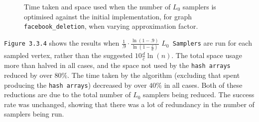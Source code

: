 \documentclass[11pt,twoside,a4paper]{report}
\begin{document}
\begin{figure}[H]
	\label{Figure 16}
	\caption{Time taken and space used when the number of $L_0$ samplers is optimised against the initial implementation, for graph \texttt{facebook\_deletion}, when varying approximation factor.}
\end{figure}
\texttt{Figure 3.3.4} shows the results when $\frac1{.9}\cdot\frac{\ln(1-.9)}{\ln(1-\frac{c}d)}$ \texttt{$L_0$ Samplers} are run for each sampled vertex, rather than the suggested $10\frac{d}{c}\ln(n)$. The total space usage more than halved in all cases, and the space not used by the \texttt{hash arrays} reduced by over $80\%$. The time taken by the algorithm (excluding that spent producing the \texttt{hash arrays}) decreased by over $40\%$ in all cases. Both of these reductions are due to the total number of $L_0$ samplers being reduced. The success rate was unchanged, showing that there was a lot of redundancy in the number of samplers being run.
\end{document}
